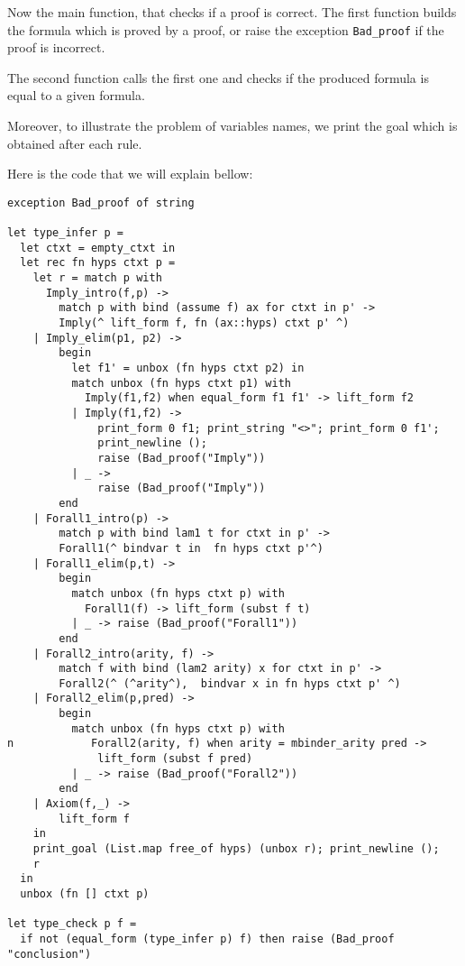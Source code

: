 \documentclass[11pt]{article}
\begin{document}
Now the main function, that checks if a proof is correct. The first
function builds the formula which is proved by a proof, or raise the
exception \verb#Bad_proof# if the proof is incorrect.

The second function calls the first one and checks if the produced
formula is equal to a given formula.

Moreover, to illustrate the problem of variables names, we print the
goal which is obtained after each rule.

Here is the code that we will explain bellow:
\begin{verbatim}
exception Bad_proof of string

let type_infer p =
  let ctxt = empty_ctxt in
  let rec fn hyps ctxt p =
    let r = match p with
      Imply_intro(f,p) ->
        match p with bind (assume f) ax for ctxt in p' ->
        Imply(^ lift_form f, fn (ax::hyps) ctxt p' ^)
    | Imply_elim(p1, p2) ->
        begin
          let f1' = unbox (fn hyps ctxt p2) in
          match unbox (fn hyps ctxt p1) with
            Imply(f1,f2) when equal_form f1 f1' -> lift_form f2
          | Imply(f1,f2) ->
              print_form 0 f1; print_string "<>"; print_form 0 f1';
              print_newline ();
              raise (Bad_proof("Imply"))
          | _ ->
              raise (Bad_proof("Imply"))
        end
    | Forall1_intro(p) ->
        match p with bind lam1 t for ctxt in p' ->
        Forall1(^ bindvar t in  fn hyps ctxt p'^)
    | Forall1_elim(p,t) ->
        begin
          match unbox (fn hyps ctxt p) with
            Forall1(f) -> lift_form (subst f t)
          | _ -> raise (Bad_proof("Forall1"))
        end
    | Forall2_intro(arity, f) ->
        match f with bind (lam2 arity) x for ctxt in p' ->
        Forall2(^ (^arity^),  bindvar x in fn hyps ctxt p' ^)
    | Forall2_elim(p,pred) ->
        begin
          match unbox (fn hyps ctxt p) with
n            Forall2(arity, f) when arity = mbinder_arity pred ->
              lift_form (subst f pred)
          | _ -> raise (Bad_proof("Forall2"))
        end
    | Axiom(f,_) ->
        lift_form f
    in
    print_goal (List.map free_of hyps) (unbox r); print_newline ();
    r
  in
  unbox (fn [] ctxt p)

let type_check p f =
  if not (equal_form (type_infer p) f) then raise (Bad_proof "conclusion")
\end{verbatim}
\end{document}
